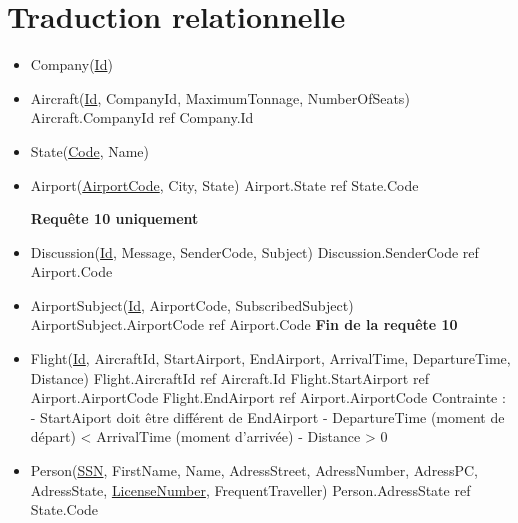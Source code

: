\documentclass[french, utf8]{article}
\begin{document}
\section{Traduction relationnelle}
\begin{itemize}
    \item Company(\underline{Id})
    \newline
    \item Aircraft(\underline{Id}, CompanyId, MaximumTonnage, NumberOfSeats)
    \subitem Aircraft.CompanyId ref Company.Id
    \newline

    \item State(\underline{Code}, Name)
    \newline

    \item Airport(\underline{AirportCode}, City, State)
    \subitem Airport.State ref State.Code
    \newline

    \textbf{Requête 10 uniquement}
    \hline
    \newline

    \item Discussion(\underline{Id}, Message, SenderCode, Subject)
    \subitem Discussion.SenderCode ref Airport.Code
    \newline

    \item AirportSubject(\underline{Id}, AirportCode, SubscribedSubject)
    \subitem AirportSubject.AirportCode ref Airport.Code
    \newline
    \hline
    \textbf{Fin de la requête 10}
    \newline

    \item Flight(\underline{Id}, AircraftId, StartAirport, EndAirport, ArrivalTime, DepartureTime, Distance)
    \subitem Flight.AircraftId ref Aircraft.Id
    \subitem Flight.StartAirport ref Airport.AirportCode
    \subitem Flight.EndAirport ref Airport.AirportCode
    \newline
    \subitem Contrainte :
    \subsubitem - StartAiport doit être différent de EndAirport
    \subsubitem - DepartureTime (moment de départ) < ArrivalTime (moment d'arrivée)
    \subsubitem - Distance > 0
    \newline

    \item Person(\underline{SSN}, FirstName, Name, AdressStreet, AdressNumber, AdressPC, AdressState, \underline{LicenseNumber}, FrequentTraveller)
    \subitem Person.AdressState ref State.Code
    \newline


\end{itemize}
\end{document}
